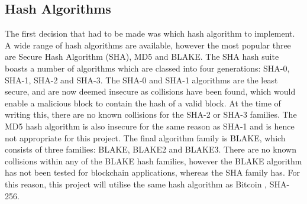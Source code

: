 \documentclass[a4paper, 11pt]{report}
\begin{document}
\subsection{Hash Algorithms} 
The first decision that had to be made was which hash algorithm to implement. A wide range of hash algorithms are available, however the most popular three are Secure Hash Algorithm (SHA), MD5 and BLAKE. The SHA hash suite boasts a number of algorithms which are classed into four generations: SHA-0, SHA-1, SHA-2 and SHA-3. The SHA-0 and SHA-1 algorithms are the least secure, and are now deemed insecure as collisions have been found, which would enable a malicious block to contain the hash of a valid block. At the time of writing this, there are no known collisions for the SHA-2 or SHA-3 families. The MD5 hash algorithm is also insecure for the same reason as SHA-1 and is hence not appropriate for this project. The final algorithm family is BLAKE, which consists of three families: BLAKE, BLAKE2 and BLAKE3. There are no known collisions within any of the BLAKE hash families, however the BLAKE algorithm has not been tested for \gls{blockchain} applications, whereas the SHA family has. For this reason, this project will utilise the same hash algorithm as Bitcoin \cite{bitcoin}, SHA-256.
\end{document}
